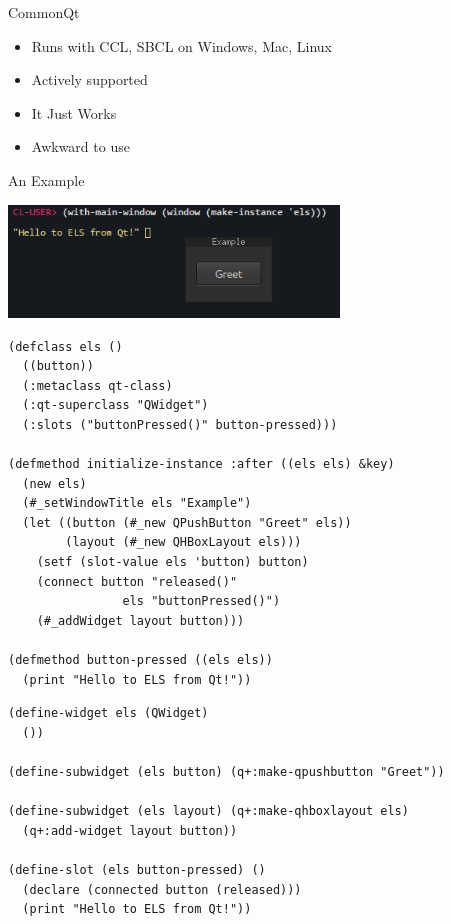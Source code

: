 \documentclass[14pt]{beamer}
\newcommand{\toptitle}[1]{
  {\huge #1} \\
  \vspace{0.2cm}
}
\begin{document}
\begin{frame}
  \toptitle{CommonQt}
  \begin{itemize}
  \item Runs with CCL, SBCL on Windows, Mac, Linux
  \item Actively supported
  \item It Just Works\texttrademark
    \pause
  \item Awkward to use
  \end{itemize}
\end{frame}

\begin{frame}
  \toptitle{An Example}
  \begin{center}
    \includegraphics[height=3cm]{example.png}
  \end{center}
\end{frame}

\begin{frame}[fragile]
  \fontsize{9pt}{9pt}
\begin{verbatim}
(defclass els () 
  ((button))
  (:metaclass qt-class)
  (:qt-superclass "QWidget")
  (:slots ("buttonPressed()" button-pressed)))

(defmethod initialize-instance :after ((els els) &key)
  (new els)
  (#_setWindowTitle els "Example")
  (let ((button (#_new QPushButton "Greet" els))
        (layout (#_new QHBoxLayout els)))
    (setf (slot-value els 'button) button)
    (connect button "released()" 
                els "buttonPressed()")
    (#_addWidget layout button)))

(defmethod button-pressed ((els els))
  (print "Hello to ELS from Qt!"))
\end{verbatim}
\end{frame}

\begin{frame}[fragile]
  \fontsize{9pt}{9pt}
\begin{verbatim}
(define-widget els (QWidget)
  ())

(define-subwidget (els button) (q+:make-qpushbutton "Greet"))

(define-subwidget (els layout) (q+:make-qhboxlayout els)
  (q+:add-widget layout button))

(define-slot (els button-pressed) ()
  (declare (connected button (released)))
  (print "Hello to ELS from Qt!"))
\end{verbatim}
\end{frame}
\end{document}
